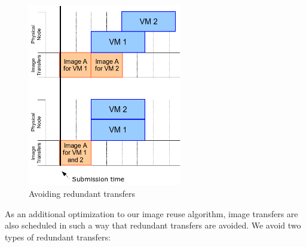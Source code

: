 \begin{figure}
  \begin{center}
    \includegraphics[width=0.6\textwidth]{figures/piggybacking.png}
    \caption{Avoiding redundant transfers}
	\label{fig:piggyback}
  \end{center}
\end{figure}

As an additional optimization to our image reuse algorithm, image transfers are also scheduled in such a way that redundant transfers are avoided. We avoid two types of redundant transfers:

